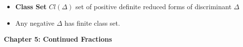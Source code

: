 \documentclass[a4paper, 12pt]
{article}
\begin{document}
\begin{itemize}
\begin{enumerate}
		\begin{align*}
			S: (x,y) &\mapsto (-y,x)\\
			T_n: (x,y) &\mapsto (x-ny, y)
		\end{align*}
		
		\item 
		\begin{itemize}
			\item \underline{Case1}: $|b| > a.$  Perform $T_n.$ Choose $n$ such that the transformed values of the coefficients satisfy $|b|>a$
			\item \underline{Case 2}: $a>c$. Perform S.
			\item \underline{Case 3}: $|b| \leq a \leq c:$ with $b<0.$  If $a=|b|$ then perform $T_{-1}$. If $a=c$ perform $S$
		\end{itemize}
		\end{enumerate}
		
		\item \textbf{Class Set} $Cl(\Delta)$ set of positive definite reduced forms of discriminant $\Delta$ 
		
		\item Any negative $\Delta$ has finite class set.
		
	\end{itemize}
	

	
	\hfill
	
	\textbf{Chapter 5: Continued Fractions}
	
\end{document}
